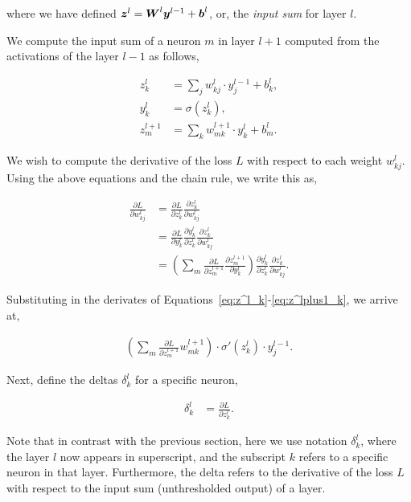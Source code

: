 where we have defined \({\boldsymbol{{z}}}^l = {\boldsymbol{{W}}}^l {\boldsymbol{{y}}}^{l-1} + {\boldsymbol{{b}}}^l\), or, the \textit{input sum} for layer \(l\).

We compute the input sum of a neuron \(m\) in layer \(l+1\) computed from the activations of the layer \(l-1\) as follows,

\begin{align}
    z^l_k &= \sum_{j} w^l_{kj} \cdot y^{l-1}_j + b^l_k,\label{eq:z^l_k} \\
    y^l_k &= \sigma (z^l_k),\label{eq:a^l_l} \\
    z^{l+1}_m &= \sum_{k} w^{l+1}_{mk} \cdot y^l_k + b^l_m.\label{eq:z^lplus1_k}
\end{align}

We wish to compute the derivative of the loss \(L\) with respect to each weight \(w^l_{kj}\). Using the above equations and the chain rule, we write this as,

\begin{align}
    \frac{\partial L}{\partial w^l_{kj}} &= \frac{\partial L}{\partial z^l_k} \frac{\partial z^l_k}{\partial w^l_{kj}} \\
    &= \frac{\partial L}{\partial y^l_k} \frac{\partial y^l_k}{\partial z^l_k} \frac{\partial z^l_k}{\partial w^l_{kj}} \\
    &= \left(
        \sum_{m} \frac{\partial L}{\partial z^{l+1}_m} \frac{\partial z^{l+1}_m}{\partial y^l_k}
    \right)
    \frac{\partial y^l_k}{\partial z^l_k} \frac{\partial z^l_k}{\partial w^l_{kj}}.
\end{align}

Substituting in the derivates of Equations~\ref{eq:z^l_k}-\ref{eq:z^lplus1_k}, we arrive at,

\begin{align}
    \left(
        \sum_{m} \frac{\partial L}{\partial z^{l+1}_m} w^{l+1}_{mk}
    \right) \cdot
    \sigma'(z^l_k) \cdot
    y^{l-1}_j.
\end{align}

Next, define the deltas \(\delta^l_k\) for a specific neuron,

\begin{align}
    \delta^l_k &= \frac{\partial L}{\partial z^l_k}. \label{eq:delta^l_k}
\end{align}

Note that in contrast with the previous section, here we use notation \(\delta^l_k\), where the layer \(l\) now appears in superscript, and the subscript \(k\) refers to a specific neuron in that layer.
Furthermore, the delta refers to the derivative of the loss \(L\) with respect to the input sum (unthresholded output) of a layer.

